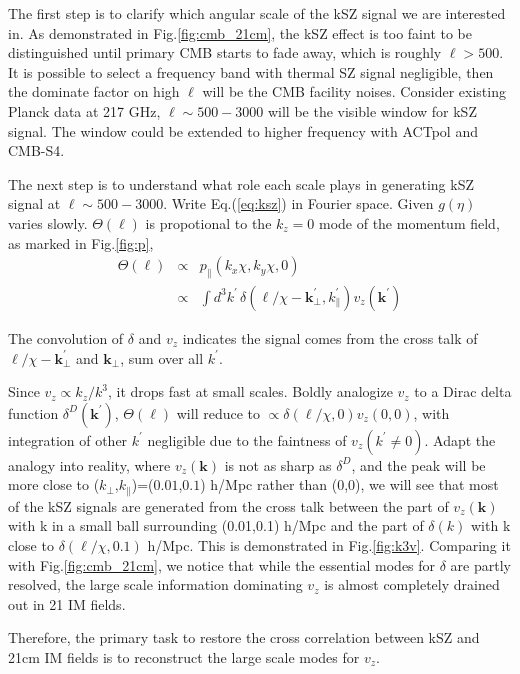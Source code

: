 The first step is to clarify which angular scale of the kSZ signal 
we are interested in. 
As demonstrated in Fig.\ref{fig:cmb_21cm}, 
the kSZ effect is too faint to 
be distinguished until 
primary CMB starts to fade away, 
which is roughly $\ell>500$. 
It is possible to select a frequency band with thermal SZ signal negligible, 
then the dominate factor on high $\ell$ will be the CMB facility noises. 
Consider existing Planck \cite{Planck2015} data at 217 GHz, 
$\ell \sim 500-3000$ will be the visible window for kSZ signal. 
The window could be extended to higher frequency with 
ACTpol and CMB-S4. 


The next step is to understand what role each scale plays in generating kSZ signal 
at $\ell \sim 500-3000$. 
Write Eq.(\ref{eq:ksz}) in Fourier space. 
Given $g(\eta)$ varies slowly. 
$\Theta(\bm{\ell})$ is propotional to the $k_z=0$ mode of the momentum field, as marked in Fig.\ref{fig:p}, 
\begin{eqnarray}
    \label{eq:thetak}
    \Theta(\bm{\ell})&\propto&p_\parallel({k}_x\chi,{k}_y\chi,0)\\
    &\propto&\int 
    d^3k^\prime\,\delta(\bm{\ell}/\chi-\bm{k}_\perp^\prime,k_\parallel^\prime) v_z(\bm{k^\prime})\nonumber
    \end{eqnarray}

The convolution of $\delta$ and $v_z$ 
indicates the signal comes from the cross talk of 
$\bm{\ell}/\chi-\bm{k}_\perp^\prime$ and $\bm{k}_\perp$, 
sum over all $k^\prime$. 

Since $v_z \propto k_z/k^3$, 
it drops fast at small scales. 
Boldly analogize $v_z$ to a Dirac delta function $\delta^D(\bm{k}^\prime)$, 
$\Theta(\bm{\ell})$ will reduce to $\propto\delta(\bm{\ell}/\chi,0) v_z(0,0)$, 
with integration of other $k^\prime$ negligible due to the faintness of 
$v_z(k^\prime\neq0)$. 
Adapt the analogy into reality, 
where $v_z(\bm{k})$ 
is not as sharp as $\delta^D$, 
and the peak will be more close to 
($k_\perp$,$k_\parallel$)=($0.01$,$0.1$) h/Mpc 
rather than (0,0),
we will see  
that most of the kSZ signals are 
generated from the cross talk between the part of 
$v_z(\bm{k})$ with k in a small ball  
surrounding (0.01,0.1) h/Mpc 
and the part of $\delta(k)$ with k close to 
$\delta(\bm{\ell}/\chi,0.1)$ h/Mpc. 
This is demonstrated in Fig.\ref{fig:k3v}. 
Comparing it with Fig.\ref{fig:cmb_21cm}, 
we notice that while the 
essential modes for $\delta$ are partly resolved, 
the large scale information dominating $v_z$ is 
almost completely drained out in 21 IM fields.

Therefore, the primary task to restore the cross correlation 
between kSZ and 21cm IM fields is to reconstruct the 
large scale modes for $v_z$.
